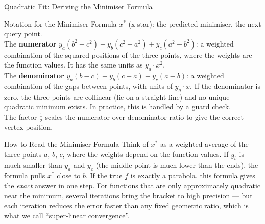 \documentclass[aspectratio=169,10pt]{beamer}
\begin{document}
\begin{frame}[allowframebreaks]{Quadratic Fit: Deriving the Minimiser Formula}
  \begin{block}{Notation for the Minimiser Formula}
    $x^{*}$ (x star): the predicted minimiser, the next query point.\\
    The \textbf{numerator} $y_a(b^2 - c^2) + y_b(c^2 - a^2) + y_c(a^2 - b^2)$:
    a weighted combination of the squared positions of the three points,
    where the weights are the function values.  It has the same units as
    $y_a \cdot x^2$.\\
    The \textbf{denominator} $y_a(b - c) + y_b(c - a) + y_c(a - b)$:
    a weighted combination of the gaps between points, with units of
    $y_a \cdot x$.  If the denominator is zero, the three points are collinear
    (lie on a straight line) and no unique quadratic minimum exists.  In practice,
    this is handled by a guard check.\\
    The factor $\tfrac{1}{2}$ scales the numerator-over-denominator ratio to
    give the correct vertex position.
  \end{block}

  \begin{alertblock}{How to Read the Minimiser Formula}
    Think of $x^*$ as a weighted average of the three points $a$, $b$, $c$,
    where the weights depend on the function values.  If $y_b$ is much smaller
    than $y_a$ and $y_c$ (the middle point is much lower than the ends), the
    formula pulls $x^*$ close to $b$.  If the true $f$ is exactly a parabola,
    this formula gives the \emph{exact} answer in one step.  For functions that
    are only approximately quadratic near the minimum, several iterations bring
    the bracket to high precision --- but each iteration reduces the error
    faster than any fixed geometric ratio, which is what we call
    ``super-linear convergence''.
  \end{alertblock}

\end{frame}
\end{document}
